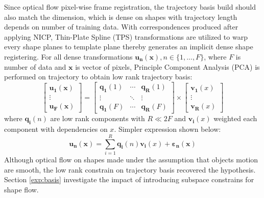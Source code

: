 Since optical flow pixel-wise frame registration, the trajectory basis build should also match the dimension, which is dense on shapes with trajectory length depends on number of training data. With correspondences produced after applying NICP, Thin-Plate Spline (TPS)\cite{Bookstein1989} transformations are utilized to warp every shape planes to template plane thereby generates an implicit dense shape registering. For all dense transformations $\bm{u_n}(\bm{x}), n \in \{1,...,F\}$, where $F$ is number of data and $\bm{x}$ is vector of pixels, Principle Component Analysis (PCA) is performed on trajectory to obtain low rank trajectory basis:
\begin{equation}
    \begin{bmatrix}
        \bm{u_1}(\bm{x}) \\
        \vdots \\
        \bm{u_F}(\bm{x})
    \end{bmatrix}
    =
    \begin{bmatrix}
        \bm{q_1}(1) & \cdots & \bm{q_R}(1) \\
        \vdots      & \ddots & \vdots  \\
        \bm{q_1}(F) & \cdots & \bm{q_R}(F)
    \end{bmatrix}
    \times
    \begin{bmatrix}
        \bm{v_1}(x) \\
        \vdots \\
        \bm{v_R}(x)
    \end{bmatrix}
\end{equation}
where $\bm{q_i}(n)$ are low rank components with $R \ll 2F$ and $\bm{v_i}(x)$ weighted each component with dependencies on $x$. Simpler expression shown below:
\begin{equation}
    \bm{u_n}(\bm{x})=\sum_{i=1}^R\bm{q_i}(n)\bm{v_i}(x)+\bm{\varepsilon_n}(\bm{x})
\end{equation}
Although optical flow on shapes made under the assumption that objects motion are smooth, the low rank constrain on trajectory basis recovered the hypothesis. Section \ref{exp:basis} investigate the impact of introducing subspace constrains for shape flow. 

